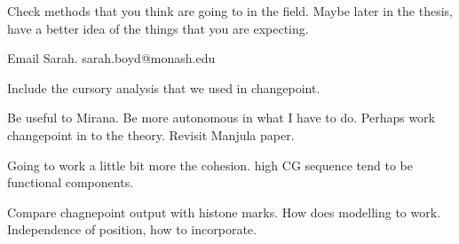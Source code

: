             
            
            
Check methods that you think are going to in the field. Maybe later in the thesis, have a better idea of the things that you are expecting. 

Email Sarah. sarah.boyd@monash.edu 

Include the cursory analysis that we used in changepoint. 

Be useful to Mirana. Be more autonomous in what I have to do. Perhaps work changepoint in to the theory. Revisit Manjula paper. 

Going to work a little bit more the cohesion. high CG sequence tend to be functional components. 

Compare chagnepoint output with histone marks. How does modelling to work. Independence of position, how to incorporate. 

                
